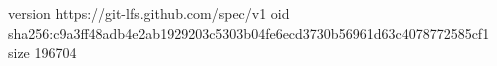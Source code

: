 version https://git-lfs.github.com/spec/v1
oid sha256:c9a3ff48adb4e2ab1929203c5303b04fe6ecd3730b56961d63c4078772585cf1
size 196704
